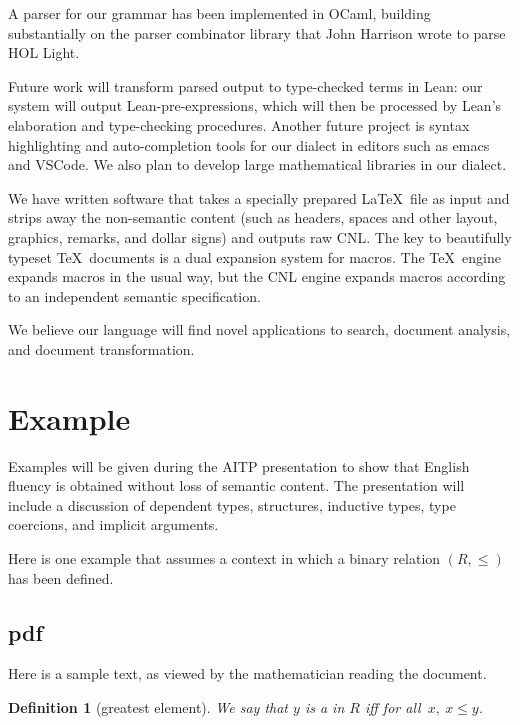 \documentclass{easychair}
\newtheorem{definition}{Definition}
\newcommand{\df}[1]{\text{\bf #1}}
\renewcommand{\~}{\ }
\renewcommand{\_}{\textunderscore}
\begin{document}
A parser for our grammar has been implemented in OCaml, building
substantially on the parser combinator library that John Harrison
wrote to parse HOL Light.

Future work will transform parsed output to type-checked terms in
Lean: our system will output Lean-pre-expressions, which will then be
processed by Lean's elaboration and type-checking procedures.  Another
future project is syntax highlighting and auto-completion tools for
our dialect in editors such as emacs and VSCode. We also plan to
develop large mathematical libraries in our dialect.

We have written software that takes a specially prepared \LaTeX\ file
as input and strips away the non-semantic content (such as headers,
spaces and other layout, graphics, remarks, and dollar signs) and
outputs raw CNL.  The key to beautifully typeset \TeX\ documents is a
dual expansion system for macros.  The \TeX\ engine expands macros in
the usual way, but the CNL engine expands macros according to an
independent semantic specification.

We believe our language will find novel applications to search,
document analysis, and document transformation.





\newpage
\section{Example}

Examples will be given during the AITP presentation to show that English
fluency is obtained without loss of semantic content. The presentation
will include a discussion of dependent types, structures, inductive types,
type coercions, and implicit arguments.

Here is one example that
assumes a context in which a binary relation $(R,\le)$ has been defined.



\subsection{pdf} Here is a sample text, as viewed by the mathematician
reading the document.  

\def\deflabel#1{\begin{definition}[#1]\label{#1}}
\deflabel{greatest element} We say that $y$ is a
\df{greatest\~element} in $R$ iff for all\ $x,\ x \le y$.
\end{definition}
\end{document}
